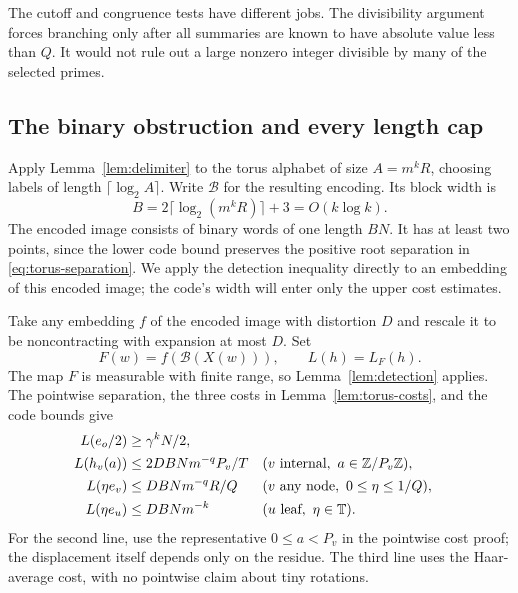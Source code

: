 The cutoff and congruence tests have different jobs. The divisibility
argument forces branching only after all summaries are known to have
absolute value less than $Q$. It would not rule out a large nonzero
integer divisible by many of the selected primes.

\subsection{The binary obstruction and every length cap}

Apply Lemma~\ref{lem:delimiter} to the torus alphabet of size
$A=m^kR$, choosing labels of length $\lceil\log_2A\rceil$. Write
$\mathcal B$ for the resulting encoding. Its block width is
\begin{equation}\label{eq:torus-code-width}
 B=2\lceil\log_2(m^kR)\rceil+3=O(k\log k).
\end{equation}
The encoded image consists of binary words of one length $BN$.
It has at least two points, since the lower code bound preserves the
positive root separation in \eqref{eq:torus-separation}. We apply the
detection inequality directly to an embedding of this encoded image;
the code's width will enter only the upper cost estimates.

Take any embedding $f$ of the encoded image with distortion $D$ and
rescale it to be noncontracting with expansion at most $D$. Set
\[
 F(w)=f(\mathcal B(X(w))),\qquad L(h)=L_F(h).
\]
The map $F$ is measurable with finite range, so
Lemma~\ref{lem:detection} applies. The pointwise separation, the three
costs in Lemma~\ref{lem:torus-costs}, and the code bounds give
\begin{align}
 L(e_o/2)&\geq\gamma^kN/2,\label{eq:torus-far}\\
 L(h_v(a))&\leq2DBNm^{-q}P_v/T
 &&(v\text{ internal},\ a\in\Z/P_v\Z),\label{eq:torus-cycle-l1}\\
 L(\eta e_v)&\leq DBNm^{-q}R/Q
 &&(v\text{ any node},\ 0\leq\eta\leq1/Q),\label{eq:torus-tiny-l1}\\
 L(\eta e_u)&\leq DBNm^{-k}
 &&(u\text{ leaf},\ \eta\in\T).\label{eq:torus-leaf-l1}
\end{align}
For the second line, use the representative $0\leq a<P_v$ in the
pointwise cost proof; the displacement itself depends only on the
residue. The third line uses the Haar-average cost, with no pointwise
claim about tiny rotations.

